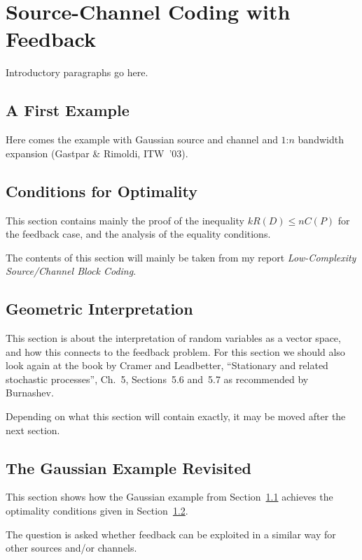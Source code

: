 \chapter{Source-Channel Coding with Feedback}
\label{ch:feedback}

Introductory paragraphs go here.


\section{A First Example}
\label{sec:gaussex}

Here comes the example with Gaussian source and channel and $1$:$n$ bandwidth
expansion (Gastpar \& Rimoldi, ITW~'03).


\section{Conditions for Optimality}
\label{sec:fboptimality}

This section contains mainly the proof of the inequality $kR(D) \le nC(P)$ for
the feedback case, and the analysis of the equality conditions. 

The contents of this section will mainly be taken from my report
\emph{Low-Complexity Source/Channel Block Coding}.


\section{Geometric Interpretation}

This section is about the interpretation of random variables as a vector space,
and how this connects to the feedback problem. For this section we should also
look again at the book by Cramer and Leadbetter, ``Stationary and related
stochastic processes'', Ch.~5, Sections~5.6 and~5.7 as recommended by Burnashev.

Depending on what this section will contain exactly, it may be moved after the
next section.


\section{The Gaussian Example Revisited}
\label{sec:gaussexrev}

This section shows how the Gaussian example from Section~\ref{sec:gaussex}
achieves the optimality conditions given in Section~\ref{sec:fboptimality}.

The question is asked whether feedback can be exploited in a similar way for
other sources and/or channels.


